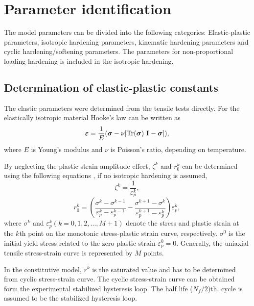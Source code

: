 \documentclass[preprint,5p,twocolumn,11pt,sort&compress]{elsarticle}
\newcommand{\bfsigma}{{\mbox{\boldmath{$\sigma$}}}}
\newcommand{\bfepsilon}{{\mbox{\boldmath{$\varepsilon$}}}}
\begin{document}
\section{Parameter identification}
The model parameters can be divided into the following categories: Elastic-plastic parameters, isotropic hardening parameters, kinematic hardening parameters and cyclic hardening/softening parameters. The parameters for non-proportional loading hardening is included in the isotropic hardening.

\subsection{Determination of elastic-plastic constants}

The elastic parameters were determined from the tensile tests directly. For the elastically isotropic material Hooke's law can be written as
\begin{eqnarray}
   \bfepsilon = \frac{1}{E}(\bfsigma - \nu[\mathrm{Tr}(\bfsigma)~\mathbf{I} - \bfsigma]),
\label{Equ:HookesLawInEandNu}
\end{eqnarray}
where $E$ is  Young's modulus and $\nu$ is Poisson's ratio, depending on temperature.

By neglecting the plastic strain amplitude effect, ${\zeta ^k}$ and  $r_0^k$ can be determined using the following equations \cite{Jiang1996387, jiang1996modeling}, if no isotropic hardening is assumed,
\begin{equation}
{\zeta ^k} = \frac{1}{{\varepsilon _p^k}},
\label{Eqn:zetak}
\end{equation}
\begin{equation}
r_0^k = \left( {\frac{{\sigma _{}^k - \sigma _{}^{k - 1}}}{{\varepsilon _p^k - \varepsilon _p^{k - 1}}} - \frac{{\sigma _{}^{k + 1} - \sigma _{}^k}}{{\varepsilon _p^{k + 1} - \varepsilon _p^k}}} \right)\varepsilon _p^k,
\end{equation}
where $\sigma^k$ and $\varepsilon_p^k( k = 0,1,2,...,M+1 )$ denote the stress and plastic strain at the $k$th point on the monotonic  stress-plastic strain curve, respectively. $\sigma^0$ is the initial yield stress related to the zero plastic strain $\varepsilon_p^0=0$. Generally, the uniaxial tensile stress-strain curve is represented by $M$ points.

In the constitutive model, $r^k$ is the saturated value and has to be determined from cyclic stress-strain curve.
The cyclic stress-strain curve can be obtained form the experimental stabilized hysteresis loop.
The half life ($N_f/2$)th. cycle is assumed to be the stabilized hysteresis loop.
\end{document}

